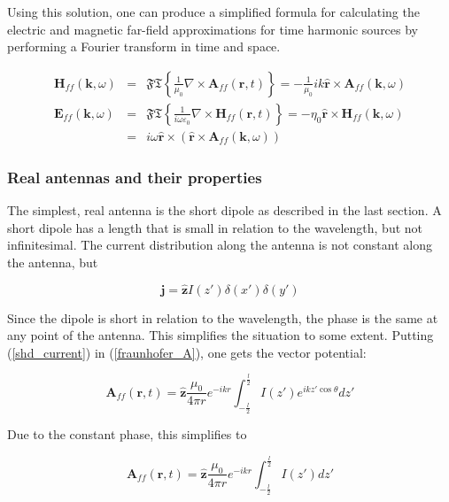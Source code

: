 \documentclass[a4paper,11pt]{report}
\begin{document}
Using this solution, one can produce a simplified formula for calculating the electric and magnetic far-field approximations for time harmonic sources by performing a Fourier transform in time and space.

\begin{eqnarray}
\mathbf{H}_{ff} (\mathbf{k},\omega)&=& \mathfrak{FT} \left\{ \frac{1}{\mu_0} \nabla \times \mathbf{A}_{ff}(\mathbf{r},t) \right\} = - \frac{1}{\mu_0} ik\mathbf{\hat{r}} \times \mathbf{A}_{ff}(\mathbf{k},\omega) \label{rule_Hff}\\
\mathbf{E}_{ff} (\mathbf{k},\omega)&=&  \mathfrak{FT} \left\{ \frac{1}{i\omega \varepsilon_0 } \nabla \times \mathbf{H}_{ff}(\mathbf{r},t) \right\}= -\eta_0 \mathbf{\hat{r}} \times \mathbf{H}_{ff}(\mathbf{k},\omega) \\
&=& i \omega \mathbf{\hat{r}} \times ( \mathbf{\hat{r}} \times \mathbf{A}_{ff}(\mathbf{k},\omega)) \label{rule_Eff}
\end{eqnarray}

\subsubsection{Real antennas and their properties}
The simplest, real antenna is the short dipole as described in the last section. A short dipole has a length that is small in relation to the wavelength, but not infinitesimal. The current distribution along the antenna is not constant along the antenna, but

\begin{equation}\label{shd_current}
 \mathbf{j} = \mathbf{\hat{z}} I(z') \delta (x') \delta (y')
\end{equation}

Since the dipole is short in relation to the wavelength, the phase is the same at any point of the antenna. This simplifies the situation to some extent. Putting (\ref{shd_current}) in (\ref{fraunhofer_A}), one gets the vector potential:


\begin{equation}\label{shd_A}
 \mathbf{A}_{ff}(\mathbf{r},t) = \mathbf{\hat{z} }\frac{\mu_0}{4 \pi r} e^{-ikr} \int_{-\frac{l}{2}}^{\frac{l}{2}} I(z') e^{ik z'\cos \theta } dz'
\end{equation}

Due to the constant phase, this simplifies to

\begin{equation}\label{shd_A_simpl}
\mathbf{A}_{ff}(\mathbf{r},t) = \mathbf{\hat{z}} \frac{\mu_0}{4 \pi r} e^{-ikr} \int_{-\frac{l}{2}}^{\frac{l}{2}} I(z') dz'
\end{equation}
\end{document}
